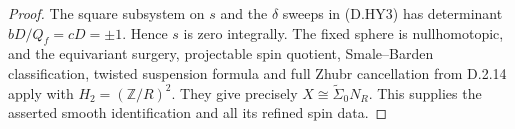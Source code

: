 \begin{proof}
The square subsystem on $s$ and the $\delta$ sweeps in (D.HY3)
has determinant $bD/Q_f=cD=\pm1$. Hence $s$ is zero integrally.
The fixed sphere is nullhomotopic, and the equivariant surgery,
projectable spin quotient, Smale--Barden classification, twisted
suspension formula and full Zhubr cancellation from D.2.14 apply
with $H_2=(\mathbb Z/R)^2$. They give precisely
$X\cong\widetilde\Sigma_0N_R$. This supplies the asserted smooth
identification and all its refined spin data.
\end{proof}
